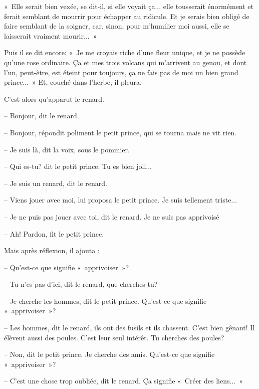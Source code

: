 \documentclass[a4paper]{report}
\begin{document}

«~Elle serait bien vexée, se dit-il, si elle voyait ça... elle tousserait énormément et ferait semblant de mourrir pour échapper au ridicule. Et je serais bien obligé de faire semblant de la soigner, car, sinon, pour m'humilier moi aussi, elle se laisserait vraiment mourir...~»

Puis il se dit encore: «~Je me croyais riche d'une fleur unique, et je ne possède qu'une rose ordinaire. Ça et mes trois volcans qui m'arrivent au genou, et dont l'un, peut-être, est éteint pour toujours, ça ne fais pas de moi un bien grand prince...~» Et, couché dans l'herbe, il pleura. 


\parachapter{} %
C'est alors qu'apparut le renard.

-- Bonjour, dit le renard.

-- Bonjour, répondit poliment le petit prince, qui se tourna mais ne vit rien.

-- Je suis là, dit la voix, sous le pommier.

-- Qui es-tu? dit le petit prince. Tu es bien joli...


-- Je suis un renard, dit le renard.

-- Viens jouer avec moi, lui proposa le petit prince. Je suis tellement triste...

-- Je ne puis pas jouer avec toi, dit le renard. Je ne suis pas apprivoisé

-- Ah! Pardon, fit le petit prince.

Mais après réflexion, il ajouta :

-- Qu'est-ce que signifie «~apprivoiser~»?

-- Tu n'es pas d'ici, dit le renard, que cherches-tu?

-- Je cherche les hommes, dit le petit prince. Qu'est-ce que signifie «~apprivoiser~»?

-- Les hommes, dit le renard, ils ont des fusils et ils chassent. C'est bien gênant! Il élèvent aussi des poules. C'est leur seul intérêt. Tu cherches des poules?

-- Non, dit le petit prince. Je cherche des amis. Qu'est-ce que signifie «~apprivoiser~»?

-- C'est une chose trop oubliée, dit le renard. Ça signifie «~Créer des liens...~»
\end{document}
